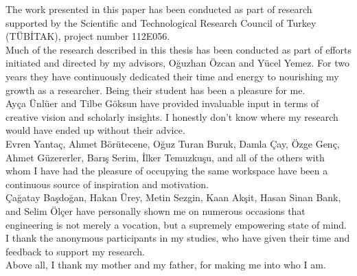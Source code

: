 \noindent The work presented in this paper has been conducted as part of research supported by the Scientific and Technological Research Council of Turkey (TÜBİTAK), project number 112E056. \\[1mm]

\noindent Much of the research described in this thesis has been conducted as part of efforts initiated and directed by my advisors, Oğuzhan Özcan and Yücel Yemez. For two years they have continuously dedicated their time and energy to nourishing my growth as a researcher. Being their student has been a pleasure for me.\\[1mm]

\noindent Ayça Ünlüer and Tilbe Göksun have provided invaluable input in terms of creative vision and scholarly insights. I honestly don't know where my research would have ended up without their advice.\\[1mm]

\noindent Evren Yantaç, Ahmet Börütecene, Oğuz Turan Buruk, Damla Çay, Özge Genç, Ahmet Güzererler, Barış Serim, İlker Temuzkuşu, and all of the others with whom I have had the pleasure of occupying the same workspace have been a continuous source of inspiration and motivation.\\[1mm]

\noindent Çağatay Başdoğan, Hakan Ürey, Metin Sezgin, Kaan Akşit, Hasan Sinan Bank, and Selim Ölçer have personally shown me on numerous occasions that engineering is not merely a vocation, but a supremely empowering state of mind.\\[1mm]

\noindent I thank the anonymous participants in my studies, who have given their time and feedback to support my research.\\[1mm]

\noindent Above all, I thank my mother and my father, for making me into who I am.